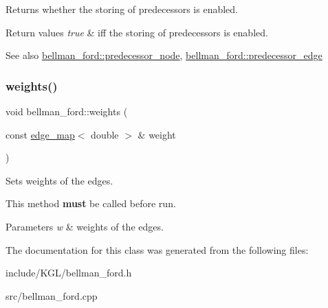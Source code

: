 Returns whether the storing of predecessors is enabled. 


\begin{DoxyRetVals}{Return values}
{\em true} & iff the storing of predecessors is enabled. ~\newline
 \\
\hline
\end{DoxyRetVals}
\begin{DoxySeeAlso}{See also}
\mbox{\hyperlink{classbellman__ford_a403e286ec8cbe3c30a7a729c5041155e}{bellman\+\_\+ford\+::predecessor\+\_\+node}}, \mbox{\hyperlink{classbellman__ford_a39f93b0b1e427cf26059fa6141c6f61c}{bellman\+\_\+ford\+::predecessor\+\_\+edge}} 
\end{DoxySeeAlso}
\mbox{\label{classbellman__ford_a9e276cc9f30c2e608d320db4a08b2a74}} 
\subsubsection{\texorpdfstring{weights()}{weights()}}
{\footnotesize\ttfamily void bellman\+\_\+ford\+::weights (\begin{DoxyParamCaption}\item[{const \mbox{\hyperlink{classedge__map}{edge\+\_\+map}}$<$ double $>$ \&}]{weight }\end{DoxyParamCaption})\hspace{0.3cm}{\ttfamily [inline]}}



Sets weights of the edges. 

This method {\bfseries must} be called before run.


\begin{DoxyParams}{Parameters}
{\em w} & weights of the edges. \\
\hline
\end{DoxyParams}


The documentation for this class was generated from the following files\+:\begin{DoxyCompactItemize}
\item 
include/\+K\+G\+L/bellman\+\_\+ford.\+h\item 
src/bellman\+\_\+ford.\+cpp\end{DoxyCompactItemize}

